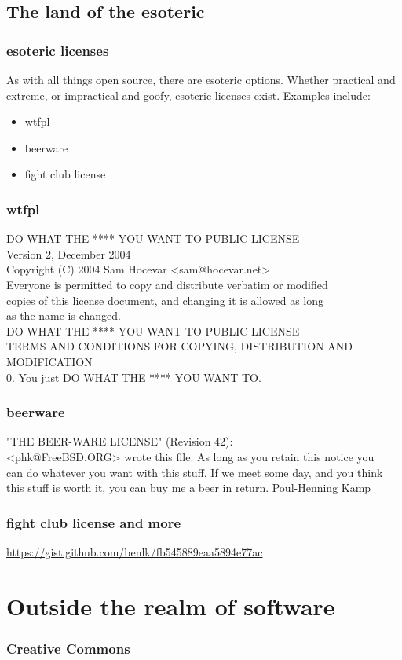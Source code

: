 \documentclass{beamer}
\begin{document}
	\subsection{The land of the esoteric}
	\begin{frame}
		\frametitle{esoteric licenses}
		As with all things open source, there are esoteric options. Whether practical and extreme, or impractical and goofy, esoteric licenses exist. Examples include:
		\pause
		\begin{itemize}[<+->]
			\item wtfpl
			\item beerware
			\item fight club license
		\end{itemize}
	\end{frame}
	\begin{frame}
		\frametitle{wtfpl}
		DO WHAT THE **** YOU WANT TO PUBLIC LICENSE\\
		Version 2, December 2004\\
		Copyright (C) 2004 Sam Hocevar <sam@hocevar.net>\\
		Everyone is permitted to copy and distribute verbatim or modified\\
		copies of this license document, and changing it is allowed as long\\
		as the name is changed.\\
		DO WHAT THE **** YOU WANT TO PUBLIC LICENSE\\
		TERMS AND CONDITIONS FOR COPYING, DISTRIBUTION AND MODIFICATION\\
		0. You just DO WHAT THE **** YOU WANT TO.\\
	\end{frame}
	\begin{frame}
		\frametitle{beerware}
		"THE BEER-WARE LICENSE" (Revision 42):\\
		<phk@FreeBSD.ORG> wrote this file. As long as you retain this notice you\\
		can do whatever you want with this stuff. If we meet some day, and you think\\
		this stuff is worth it, you can buy me a beer in return.   Poul-Henning Kamp\\
	\end{frame}
	\begin{frame}
		\frametitle{fight club license and more}
		\center\url{https://gist.github.com/benlk/fb545889eaa5894e77ac}
	\end{frame}
	\section{Outside the realm of software}
	\begin{frame}
		\frametitle{Creative Commons}
		
	\end{frame}
\end{document}
